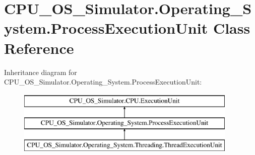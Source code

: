 \hypertarget{class_c_p_u___o_s___simulator_1_1_operating___system_1_1_process_execution_unit}{}\section{C\+P\+U\+\_\+\+O\+S\+\_\+\+Simulator.\+Operating\+\_\+\+System.\+Process\+Execution\+Unit Class Reference}
\label{class_c_p_u___o_s___simulator_1_1_operating___system_1_1_process_execution_unit}
Inheritance diagram for C\+P\+U\+\_\+\+O\+S\+\_\+\+Simulator.\+Operating\+\_\+\+System.\+Process\+Execution\+Unit\+:\begin{figure}[H]
\begin{center}
\leavevmode
\includegraphics[height=3.000000cm]{class_c_p_u___o_s___simulator_1_1_operating___system_1_1_process_execution_unit}
\end{center}
\end{figure}
